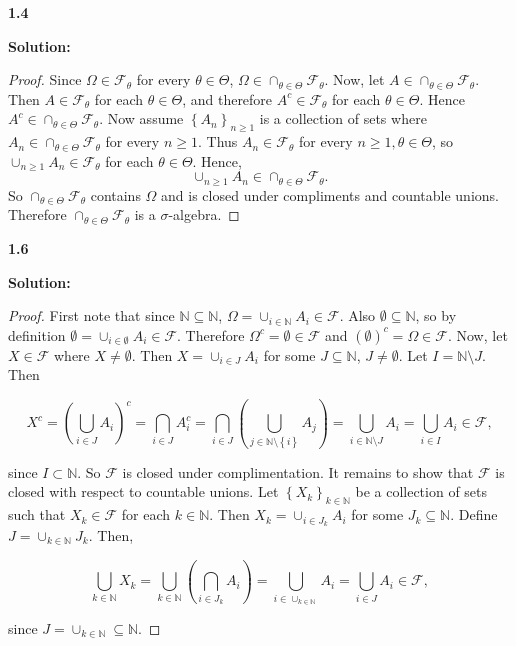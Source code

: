 \documentclass[12pt]{article}
\begin{document}
{\bf 1.4}

{\bf Solution:}

\begin{proof}
Since $\Omega \in \mathcal{F}_{\theta}$ for every $\theta \in \Theta$, $\Omega \in \cap_{\theta \in \Theta}\mathcal{F}_{\theta}$. Now, let $A \in
\cap_{\theta \in \Theta}\mathcal{F}_{\theta}$. Then $A \in \mathcal{F}_{\theta}$ for each $\theta \in \Theta$, and therefore $A^{c} \in
\mathcal{F}_{\theta}$ for each $\theta \in \Theta$. Hence $A^{c} \in \cap_{\theta \in \Theta}\mathcal{F}_{\theta}$. Now assume $\left\{ A_{n}
\right\}_{n\geq 1}$ is a collection of sets where $A_{n} \in \cap_{\theta \in \Theta}\mathcal{F}_{\theta}$ for every $n \geq 1$. Thus $A_{n}
\in \mathcal{F}_{\theta}$ for every $n \geq 1, \theta \in \Theta$, so $\cup_{n\geq 1}A_{n} \in \mathcal{F}_{\theta}$ for each $\theta \in \Theta$. Hence,
\[ \cup_{n \geq 1}A_{n} \in \cap_{\theta\in\Theta}\mathcal{F}_{\theta}. \]
So $\cap_{\theta \in \Theta}\mathcal{F}_{\theta}$ contains $\Omega$ and is closed under compliments and countable unions. Therefore
$\cap_{\theta\in\Theta}\mathcal{F}_{\theta}$ is a $\sigma$-algebra.
\end{proof}

{\bf 1.6}

{\bf Solution:}

\begin{proof}
First note that since $\mathbb{N} \subseteq \mathbb{N}$, $\Omega = \cup_{i\in\mathbb{N}}A_{i} \in \mathcal{F}$. Also $\emptyset \subseteq \mathbb{N}$,
so by definition $\emptyset = \cup_{i \in \emptyset}A_{i} \in \mathcal{F}$. Therefore $\Omega^{c} = \emptyset \in \mathcal{F}$ and $(\emptyset)^{c} =
\Omega \in \mathcal{F}$. Now, let $X \in \mathcal{F}$ where $X \neq \emptyset$. Then $X = \cup_{i\in J}A_{i}$ for some $J \subseteq \mathbb{N}$, $J
\neq \emptyset$. Let $I = \mathbb{N} \setminus J$. Then 

\[ X^{c} = \left( \bigcup_{i\in J}A_{i} \right)^{c} = \bigcap_{i\in J}A_{i}^{c} = \bigcap_{i\in J}\left( \bigcup_{j\in \mathbb{N}\setminus \left\{ i
\right\}} A_{j} \right) = \bigcup_{i \in \mathbb{N}\setminus J}A_{i} = \bigcup_{i \in I}A_{i} \in \mathcal{F}, \]

since $I \subset \mathbb{N}$. So $\mathcal{F}$ is closed under complimentation. It remains to show that $\mathcal{F}$ is closed with respect to
countable unions. Let $\left\{ X_{k} \right\}_{k \in \mathbb{N}}$ be a collection of sets such that $X_{k} \in \mathcal{F}$ for each $k \in
\mathbb{N}$. Then $X_{k} = \cup_{i\in J_{k}}A_{i}$ for some $J_{k} \subseteq \mathbb{N}$. Define $J = \cup_{k\in\mathbb{N}}J_{k}$. Then,

\[ \bigcup_{k\in\mathbb{N}}X_{k} = \bigcup_{k\in\mathbb{N}}\left( \bigcap_{i\in J_{k}}A_{i} \right) = \bigcup_{i \in \cup_{k \in \mathbb{N}}}A_{i} = \bigcup_{i
\in J}A_{i} \in \mathcal{F}, \]

since $J = \cup_{k \in \mathbb{N}} \subseteq \mathbb{N}$.
\end{proof}
\end{document}
